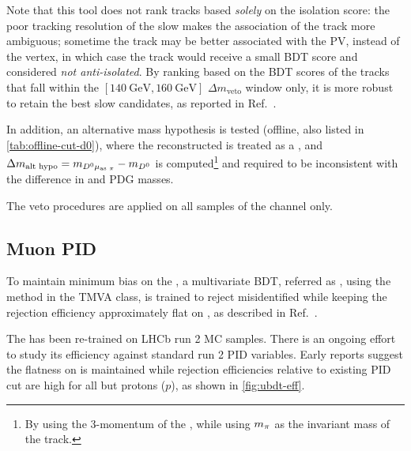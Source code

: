 Note that this tool does not rank tracks based \emph{solely} on the isolation
score:
the poor tracking resolution of the slow \pion makes the association of
the track more ambiguous;
sometime the track may be better associated with the PV,
instead of the \B vertex,
in which case the track would receive a small BDT score and considered
\emph{not anti-isolated}.
By ranking based on the BDT scores of the tracks that fall within the
$[140~\text{GeV}, 160~\text{GeV}]$
$\Delta m_\text{veto}$ window only,
it is more robust to retain the best slow \pion candidates,
as reported in Ref.~\cite{LHCb-ANA-2020-056}.

In addition, an alternative mass hypothesis is tested
(offline, also listed in \cref{tab:offline-cut-d0}), where the reconstructed
\muon is treated as a \pion,
and $\Delta m_\text{alt hypo} = m_{{{D}^0}{\mu}_\text{as {\ensuremath{\pi}}}} - m_{{D}^0}$
is computed\footnote{
    By using the 3-momentum of the \muon, while using $m_{\pi}$ as the invariant
    mass of the track.
} and required to be inconsistent with the difference in \Dstar and \Dz
PDG masses.

The veto procedures are applied on all samples of the \Dz channel only.


\subsection{Muon PID}
\label{ref:sel:algo:ubdt}

To maintain minimum bias on the \muon \pt,
a multivariate BDT,
referred as \UBDT,
using the  method in the TMVA class,
is trained to reject misidentified \muon while keeping the rejection
efficiency approximately flat on \pt,
as described in Ref.~\cite{LHCb-ANA-2020-056}.

The \UBDT has been re-trained on LHCb run 2 MC samples.
There is an ongoing effort to study its efficiency against standard run 2 PID
variables.
Early reports suggest the flatness on \pt is maintained while rejection
efficiencies relative to existing PID cut are high for all but protons ($p$),
as shown in \cref{fig:ubdt-eff}.

